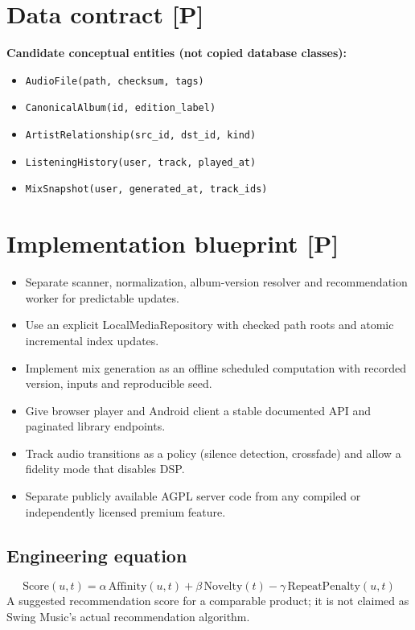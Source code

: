 \documentclass[10pt,a4paper,oneside]{report}
\begin{document}
\section{Data contract [P]}
\begin{evidencebox}\small\textbf{Candidate conceptual entities (not copied database classes):}\par
\begin{itemize}[leftmargin=*,itemsep=1pt,topsep=2pt]
\item \texttt{AudioFile(path, checksum, tags)}
\item \texttt{CanonicalAlbum(id, edition\_label)}
\item \texttt{ArtistRelationship(src\_id, dst\_id, kind)}
\item \texttt{ListeningHistory(user, track, played\_at)}
\item \texttt{MixSnapshot(user, generated\_at, track\_ids)}
\end{itemize}\end{evidencebox}
\section{Implementation blueprint [P]}
\begin{itemize}[leftmargin=*,itemsep=2pt,topsep=3pt]
\item Separate scanner, normalization, album-version resolver and recommendation worker for predictable updates.
\item Use an explicit LocalMediaRepository with checked path roots and atomic incremental index updates.
\item Implement mix generation as an offline scheduled computation with recorded version, inputs and reproducible seed.
\item Give browser player and Android client a stable documented API and paginated library endpoints.
\item Track audio transitions as a policy (silence detection, crossfade) and allow a fidelity mode that disables DSP.
\item Separate publicly available AGPL server code from any compiled or independently licensed premium feature.
\end{itemize}
\subsection*{Engineering equation}
\begin{equation*}\mathrm{Score}(u,t)=\alpha\,\mathrm{Affinity}(u,t)+\beta\,\mathrm{Novelty}(t)-\gamma\,\mathrm{RepeatPenalty}(u,t)\end{equation*}
A suggested recommendation score for a comparable product; it is not claimed as Swing Music's actual recommendation algorithm.\par
\end{document}
